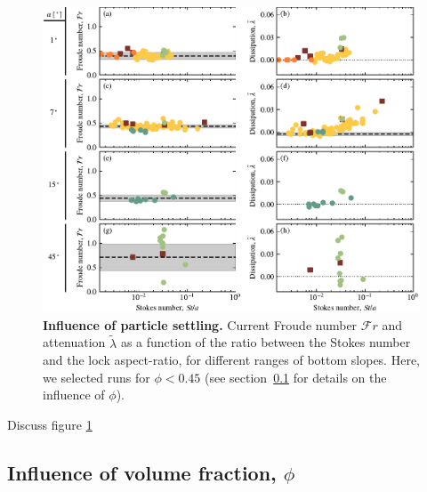 \documentclass[twocolumn]{article}
\begin{document}
\begin{figure}
	\centering
	\includegraphics{figure5.pdf}
	\caption{\textbf{Influence of particle settling.} Current Froude number $\mathcal{F}r$ and attenuation $\tilde{\lambda}$ as a function of the ratio between the Stokes number and the lock aspect-ratio, for different ranges of bottom slopes. Here, we selected runs for $\phi < 0.45$ (see section~\ref{sec:influence_phi} for details on the influence of $\phi$).}
	\label{fig:fig5}
\end{figure}

Discuss figure \ref{fig:fig5}

\subsection{Influence of volume fraction, $\phi$}
\label{sec:influence_phi}
\end{document}
